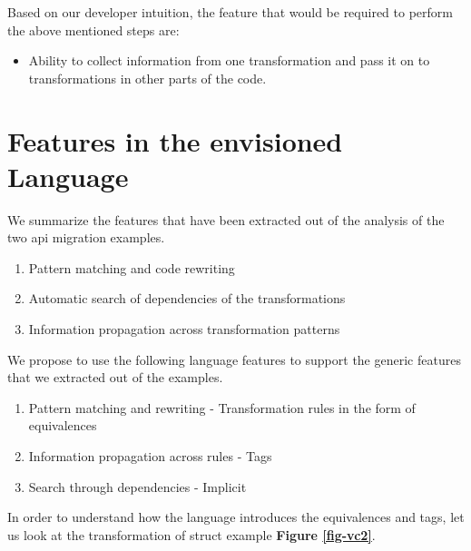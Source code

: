 \documentclass[preprint]{sigplanconf}
\begin{document}
Based on our developer intuition, the feature that would be required to perform the above mentioned steps are:
\begin{itemize}
\item Ability to collect information from one transformation and pass it on to transformations in other parts of the code.
\end{itemize}

\section{Features in the envisioned Language}
We summarize the features that have been extracted out of the analysis of the two api migration examples.
\begin{enumerate}
\item Pattern matching and code rewriting
\item Automatic search of dependencies of the transformations
\item Information propagation across transformation patterns
\end{enumerate}
We propose to use the following language features to support the generic features that we extracted out of the examples.
\begin{enumerate}
\item Pattern matching and rewriting - Transformation rules in the form of equivalences
\item Information propagation across rules - Tags 
\item Search through dependencies - Implicit
\end{enumerate}

In order to understand how the language introduces the equivalences and tags, let us look at the transformation of struct example \textbf{Figure \ref{fig-vc2}}.
\end{document}

